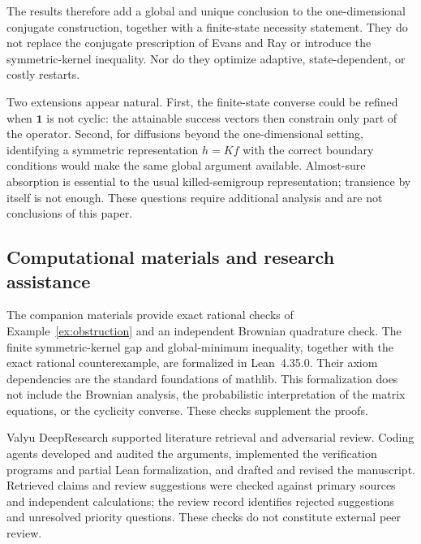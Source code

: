\documentclass[11pt]{amsart}
\theoremstyle{definition}
\theoremstyle{remark}
\newcommand{\one}{\mathbf 1}
\begin{document}
The results therefore add a global and unique conclusion to the one-dimensional conjugate construction, together with a finite-state necessity statement. They do not replace the conjugate prescription of Evans and Ray or introduce the symmetric-kernel inequality. Nor do they optimize adaptive, state-dependent, or costly restarts.

Two extensions appear natural. First, the finite-state converse could be refined when $\one$ is not cyclic: the attainable success vectors then constrain only part of the operator. Second, for diffusions beyond the one-dimensional setting, identifying a symmetric representation $h=Kf$ with the correct boundary conditions would make the same global argument available. Almost-sure absorption is essential to the usual killed-semigroup representation; transience by itself is not enough. These questions require additional analysis and are not conclusions of this paper.

\subsection*{Computational materials and research assistance}
The companion materials provide exact rational checks of Example~\ref{ex:obstruction} and an independent Brownian quadrature check. The finite symmetric-kernel gap and global-minimum inequality, together with the exact rational counterexample, are formalized in Lean~4.35.0. Their axiom dependencies are the standard foundations of mathlib. This formalization does not include the Brownian analysis, the probabilistic interpretation of the matrix equations, or the cyclicity converse. These checks supplement the proofs.

Valyu DeepResearch supported literature retrieval and adversarial review. Coding agents developed and audited the arguments, implemented the verification programs and partial Lean formalization, and drafted and revised the manuscript. Retrieved claims and review suggestions were checked against primary sources and independent calculations; the review record identifies rejected suggestions and unresolved priority questions. These checks do not constitute external peer review.



\end{document}
